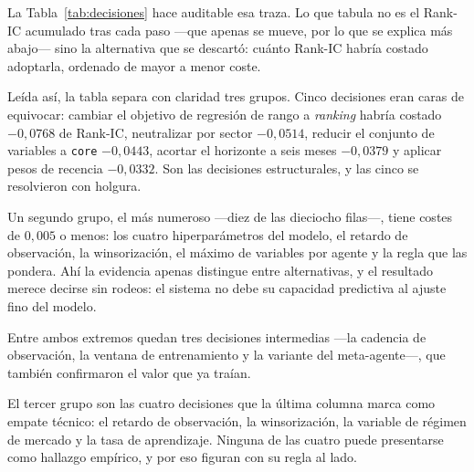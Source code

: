 La Tabla~\ref{tab:decisiones} hace auditable esa traza. Lo que tabula no es el Rank-IC acumulado
tras cada paso ---que apenas se mueve, por lo que se explica más abajo--- sino la
alternativa que se descartó: cuánto Rank-IC habría costado adoptarla, ordenado de mayor a menor
coste.

\begin{table}[htbp]
  \centering
  \small
  \caption{Qué alternativa se rechazó en cada decisión y cuánto habría costado adoptarla.}
  \label{tab:decisiones}
  \resizebox{\textwidth}{!}{}
  \caption*{El coste es el Rank-IC de la mejor alternativa menos el del ganador; un coste
  \emph{positivo} indica que la alternativa medía mejor y que el ganador se decidió por otra vía, lo
  que ocurre en dos filas y se comenta más abajo. No debe confundirse con la \emph{ventaja pareada},
  que promedia la diferencia cohorte a cohorte: en el método de combinación del meta-agente el coste
  es $-0{,}0071$ y la ventaja pareada $+0{,}00699$.}
\end{table}

Leída así, la tabla separa con claridad tres grupos. Cinco decisiones eran caras de equivocar:
cambiar el objetivo de regresión de rango a \textit{ranking} habría costado $-0{,}0768$ de Rank-IC,
neutralizar por sector $-0{,}0514$, reducir el conjunto de variables a \texttt{core} $-0{,}0443$,
acortar el horizonte a seis meses $-0{,}0379$ y aplicar pesos de recencia $-0{,}0332$. Son las
decisiones estructurales, y las cinco se resolvieron con holgura.

Un segundo grupo, el más numeroso ---diez de las dieciocho filas---, tiene costes de $0{,}005$ o
menos: los cuatro hiperparámetros del modelo, el retardo de observación, la winsorización, el máximo
de variables por agente y la regla que las pondera. Ahí la evidencia apenas distingue entre
alternativas, y el resultado merece decirse sin rodeos: el sistema no debe su capacidad
predictiva al ajuste fino del modelo.

Entre ambos extremos quedan tres decisiones intermedias ---la cadencia de observación, la ventana de
entrenamiento y la variante del meta-agente---, que también confirmaron el valor que ya traían.

El tercer grupo son las cuatro decisiones que la última columna marca como empate técnico:
el retardo de observación, la winsorización, la variable de régimen de mercado y la tasa de
aprendizaje. Ninguna de las cuatro puede presentarse como hallazgo empírico, y por eso figuran con
su regla al lado.

